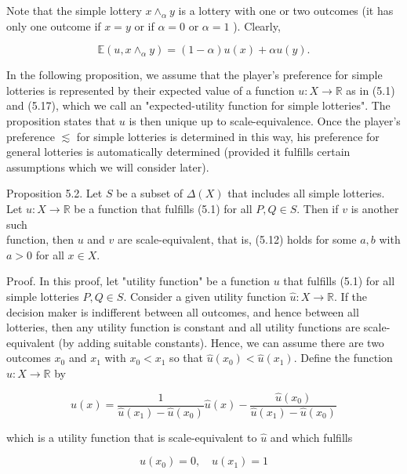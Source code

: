 \documentclass[12pt]{article}
\begin{document}
Note that the simple lottery $x \wedge_{\alpha} y$ is a lottery with one or two outcomes (it has only one outcome if $x=y$ or if $\alpha=0$ or $\alpha=1$ ). Clearly,


\begin{equation*}
\mathbb{E}\left(u, x \wedge_{\alpha} y\right)=(1-\alpha) u(x)+\alpha u(y) . \tag{5.17}
\end{equation*}


In the following proposition, we assume that the player's preference for simple lotteries is represented by their expected value of a function $u: X \rightarrow \mathbb{R}$ as in (5.1) and (5.17), which we call an "expected-utility function for simple lotteries". The proposition states that $u$ is then unique up to scale-equivalence. Once the player's preference $\lesssim$ for simple lotteries is determined in this way, his preference for general lotteries is automatically determined (provided it fulfills certain assumptions which we will consider later).

Proposition 5.2. Let $S$ be a subset of $\Delta(X)$ that includes all simple lotteries. Let $u: X \rightarrow \mathbb{R}$ be a function that fulfills (5.1) for all $P, Q \in S$. Then if $v$ is another such\\
function, then $u$ and $v$ are scale-equivalent, that is, (5.12) holds for some $a, b$ with $a>0$ for all $x \in X$.

Proof. In this proof, let "utility function" be a function $u$ that fulfills (5.1) for all simple lotteries $P, Q \in S$. Consider a given utility function $\hat{u}: X \rightarrow \mathbb{R}$. If the decision maker is indifferent between all outcomes, and hence between all lotteries, then any utility function is constant and all utility functions are scale-equivalent (by adding suitable constants). Hence, we can assume there are two outcomes $x_{0}$ and $x_{1}$ with $x_{0}<x_{1}$ so that $\hat{u}\left(x_{0}\right)<\hat{u}\left(x_{1}\right)$. Define the function $u: X \rightarrow \mathbb{R}$ by

$$
u(x)=\frac{1}{\hat{u}\left(x_{1}\right)-\hat{u}\left(x_{0}\right)} \hat{u}(x)-\frac{\hat{u}\left(x_{0}\right)}{\hat{u}\left(x_{1}\right)-\hat{u}\left(x_{0}\right)}
$$

which is a utility function that is scale-equivalent to $\hat{u}$ and which fulfills


\begin{equation*}
u\left(x_{0}\right)=0, \quad u\left(x_{1}\right)=1 \tag{5.18}
\end{equation*}
\end{document}

